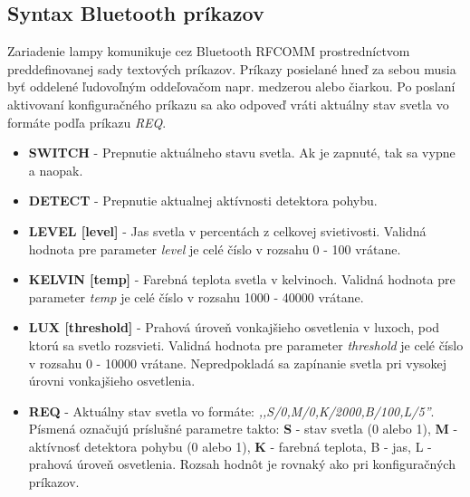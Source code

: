 \documentclass[12pt, a4paper]{article}
\begin{document}
\subsection{Syntax Bluetooth príkazov}
Zariadenie lampy komunikuje cez Bluetooth RFCOMM prostredníctvom preddefinovanej sady textových príkazov. Príkazy posielané hneď za sebou musia byť oddelené ľudovoľným oddeľovačom napr. medzerou alebo čiarkou. Po poslaní aktivovaní konfiguračného príkazu sa ako odpoveď vráti aktuálny stav svetla vo formáte podľa príkazu \emph{REQ}.
\begin{itemize}
\item \textbf{SWITCH} - Prepnutie aktuálneho stavu svetla. Ak je zapnuté, tak sa vypne a naopak.
\item \textbf{DETECT} - Prepnutie aktualnej aktívnosti detektora pohybu.
\item \textbf{LEVEL [level]} - Jas svetla v percentách z celkovej svietivosti. Validná hodnota pre parameter \emph{level} je celé číslo v rozsahu 0 - 100 vrátane.
\item \textbf{KELVIN [temp]} - Farebná teplota svetla v kelvinoch. Validná hodnota pre parameter \emph{temp} je celé číslo v rozsahu 1000 - 40000 vrátane.
\item \textbf{LUX [threshold]} - Prahová úroveň vonkajšieho osvetlenia v luxoch, pod ktorú sa svetlo rozsvieti. Validná hodnota pre parameter \emph{threshold} je celé číslo v rozsahu 0 - 10000 vrátane. Nepredpokladá sa zapínanie svetla pri vysokej úrovni vonkajšieho osvetlenia.
\item \textbf{REQ} - Aktuálny stav svetla vo formáte: \emph{,,{S/0,M/0,K/2000,B/100,L/5}''}. Písmená označujú príslušné parametre takto: \textbf{S} - stav svetla (0 alebo 1), \textbf{M} - aktívnosť detektora pohybu  (0 alebo 1), \textbf{K} - farebná teplota, B - jas,  L - prahová úroveň osvetlenia. Rozsah hodnôt je rovnaký ako pri konfiguračných príkazov.
\end{itemize}
\end{document}

